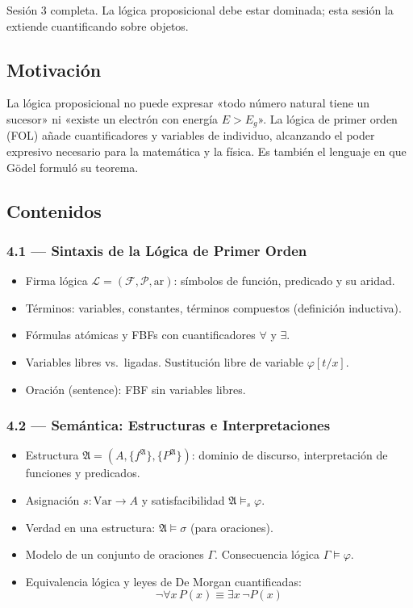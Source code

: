 \documentclass[11pt, letterpaper]{article}
\begin{document}
\begin{prereqs}
Sesión 3 completa. La lógica proposicional debe estar dominada; esta sesión la extiende cuantificando sobre objetos.
\end{prereqs}

\subsection*{Motivación}
La lógica proposicional no puede expresar «todo número natural tiene un sucesor» ni «existe un electrón con energía $E > E_g$». La lógica de primer orden (FOL) añade cuantificadores y variables de individuo, alcanzando el poder expresivo necesario para la matemática y la física. Es también el lenguaje en que Gödel formuló su teorema.

\subsection{Contenidos}

\subsubsection{4.1 — Sintaxis de la Lógica de Primer Orden}
\begin{itemize}
  \item Firma lógica $\mathcal{L}=(\mathcal{F},\mathcal{P},\text{ar})$: símbolos de función, predicado y su aridad.
  \item Términos: variables, constantes, términos compuestos (definición inductiva).
  \item Fórmulas atómicas y FBFs con cuantificadores $\forall$ y $\exists$.
  \item Variables libres vs.\ ligadas. Sustitución libre de variable $\varphi[t/x]$.
  \item Oración (sentence): FBF sin variables libres.
\end{itemize}

\subsubsection{4.2 — Semántica: Estructuras e Interpretaciones}
\begin{itemize}
  \item Estructura $\mathfrak{A}=(A, \{f^{\mathfrak{A}}\}, \{P^{\mathfrak{A}}\})$: dominio de discurso, interpretación de funciones y predicados.
  \item Asignación $s: \text{Var}\to A$ y satisfacibilidad $\mathfrak{A}\models_s\varphi$.
  \item Verdad en una estructura: $\mathfrak{A}\models\sigma$ (para oraciones).
  \item Modelo de un conjunto de oraciones $\Gamma$. Consecuencia lógica $\Gamma\models\varphi$.
  \item Equivalencia lógica y leyes de De Morgan cuantificadas:
    \[\neg\forall x\,P(x)\equiv\exists x\,\neg P(x)\]
\end{itemize}
\end{document}
